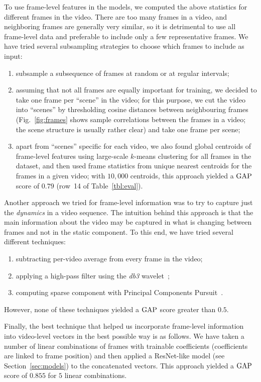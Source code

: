 \documentclass[runningheads]{llncs}
\begin{document}
To use frame-level features in the models, we computed the above statistics for different frames in the video. There are too many frames in a video, and neighboring frames are generally very similar, so it is detrimental to use all frame-level data and preferable to include only a few representative frames. We have tried several subsampling strategies to choose which frames to include as input:

\begin{enumerate}[(1)]
\item subsample a subsequence of frames at random or at regular intervals;
\item assuming that not all frames are equally important for training, we decided to take one frame per ``scene'' in the video; for this purpose, we cut the video into ``scenes'' by thresholding cosine distances between neighbouring frames (Fig.~\ref{fig:frames} shows sample correlations between the frames in a video; the scene structure is usually rather clear) and take one frame per scene;
\item apart from ``scenes'' specific for each video, we also found global centroids of frame-level features using large-scale $k$-means clustering for all frames in the dataset, and then used frame statistics from unique nearest centroids for the frames in a given video; with $10{,}000$ centroids, this approach yielded a $\mathrm{GAP}$ score of $0.79$ (row~14 of Table~\ref{tbl:eval}).
\end{enumerate}

Another approach we tried for frame-level information was to try to capture just the \emph{dynamics} in a video sequence. The intuition behind this approach is that the main information about the video may be captured in what is changing between frames and not in the static component. To this end, we have tried several different techniques:
\begin{enumerate}[(1)]
	\item subtracting per-video average from every frame in the video;
    \item applying a high-pass filter using the \emph{db3} wavelet~\cite{Daubechies:1992:TLW};
    \item computing sparse component with Principal Components Pursuit~\cite{candes2011robust}.
\end{enumerate}
However, none of these techniques yielded a $\mathrm{GAP}$ score greater than $0.5$.

Finally, the best technique that helped us incorporate frame-level information into video-level vectors in the best possible way is as follows. We have taken a number of linear combinations of frames with trainable coefficients (coefficients are linked to frame position) and then applied a ResNet-like model (see Section~\ref{sec:models}) to the concatenated vectors. This approach yielded a $\mathrm{GAP}$ score of $0.855$ for $5$ linear combinations.
\end{document}
